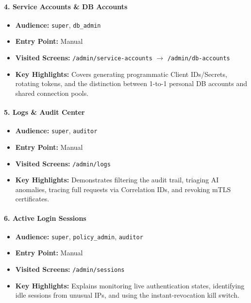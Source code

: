 \paragraph{4. Service Accounts \& DB Accounts}
\begin{itemize}
    \item \textbf{Audience:} \texttt{super}, \texttt{db\_admin}
    \item \textbf{Entry Point:} Manual
    \item \textbf{Visited Screens:} \texttt{/admin/service-accounts} $\rightarrow$ \texttt{/admin/db-accounts}
    \item \textbf{Key Highlights:} Covers generating programmatic Client IDs/Secrets, rotating tokens, and the distinction between 1-to-1 personal DB accounts and shared connection pools.
\end{itemize}

\paragraph{5. Logs \& Audit Center}
\begin{itemize}
    \item \textbf{Audience:} \texttt{super}, \texttt{auditor}
    \item \textbf{Entry Point:} Manual
    \item \textbf{Visited Screens:} \texttt{/admin/logs}
    \item \textbf{Key Highlights:} Demonstrates filtering the audit trail, triaging AI anomalies, tracing full requests via Correlation IDs, and revoking mTLS certificates.
\end{itemize}

\paragraph{6. Active Login Sessions}
\begin{itemize}
    \item \textbf{Audience:} \texttt{super}, \texttt{policy\_admin}, \texttt{auditor}
    \item \textbf{Entry Point:} Manual
    \item \textbf{Visited Screens:} \texttt{/admin/sessions}
    \item \textbf{Key Highlights:} Explains monitoring live authentication states, identifying idle sessions from unusual IPs, and using the instant-revocation kill switch.
\end{itemize}

